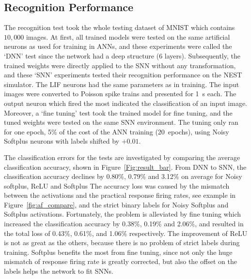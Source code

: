 \documentclass{article}
\begin{document}
	\subsection{Recognition Performance}
	\label{subsec:result_compare}
	The recognition test took the whole testing dataset of MNIST which contains $10,000$ images.
	At first, all trained models were tested on the same artificial neurons as used for training in ANNs, and these experiments were called the `DNN' test since the network had a deep structure (6 layers).
	Subsequently, the trained weights were directly applied to the SNN without any transformation, and these `SNN' experiments tested their recognition performance on the NEST simulator.
	The LIF neurons had the same parameters as in training.
	The input images were converted to Poisson spike trains and presented for 1~s each.
	The output neuron which fired the most indicated the classification of an input image.
	Moreover, a `fine tuning' test took the trained model for fine tuning, and the tuned weights were tested on the same SNN environment.
	The tuning only ran for one epoch, 5\% of the cost of the ANN training (20~epochs), using Noisy Softplus neurons with labels shifted by $+0.01$.
	
	The classification errors for the tests are investigated by comparing the average classification accuracy, shown in Figure~\ref{Fig:result_bar}.
	From DNN to SNN, the classification accuracy declines by 0.80\%, 0.79\% and 3.12\% on average for Noisy softplus, ReLU and Softplus
	The accuracy loss was caused by the mismatch between the activations and the practical response firing rates, see example in Figure~\ref{fig:af_compare}, and the strict binary labels for Noisy Softplus and Softplus activations.
	Fortunately, the problem is alleviated by fine tuning which increased the classification accuracy by 0.38\%, 0.19\% and 2.06\%, and resulted in the total loss of 0.43\%, 0.61\%, and 1.06\% respectively.
	The improvement of ReLU is not as great as the others, because there is no problem of strict labels during training.
	Softplus benefits the most from fine tuning, since not only the huge mismatch of response firing rate is greatly corrected, but also the offset on the labels helps the network to fit SNNs. 
	
	
\end{document}
